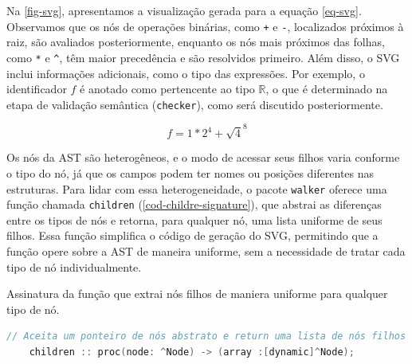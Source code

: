 Na \autoref{fig-svg}, apresentamos a visualização gerada para a equação \autoref{eq-svg}. Observamos que os nós de operações binárias, como \texttt{+} e \texttt{-}, localizados próximos à raiz, são avaliados posteriormente, enquanto os nós mais próximos das folhas, como \texttt{*} e \texttt{\^}, têm maior precedência e são resolvidos primeiro. Além disso, o SVG inclui informações adicionais, como o tipo das expressões. Por exemplo, o identificador \( f \) é anotado como pertencente ao tipo \( \mathbb{R} \), o que é determinado na etapa de validação semântica (\texttt{checker}), como será discutido posteriormente.

\begin{equation} \label{eq-svg}
   f =  1*2 ^ 4 +  \sqrt 4^8
\end{equation}

Os nós da AST são heterogêneos, e o modo de acessar seus filhos varia conforme o tipo do nó, já que os campos podem ter nomes ou posições diferentes nas estruturas. Para lidar com essa heterogeneidade, o pacote \texttt{walker} oferece uma função chamada \texttt{children} (\autoref{cod-childre-signature}), que abstrai as diferenças entre os tipos de nós e retorna, para qualquer nó, uma lista uniforme de seus filhos. 
Essa função simplifica o código de geração do SVG, permitindo que a função opere sobre a AST de maneira uniforme, sem a necessidade de tratar cada tipo de nó individualmente.


\begin{codigo}[h]
        \caption{\small Assinatura da função que extrai nós filhos de maniera uniforme para qualquer tipo de nó. }
        \label{cod-childre-signature}
  \begin{lstlisting}[language = C]
    // Aceita um ponteiro de nós abstrato e return uma lista de nós filhos
    children :: proc(node: ^Node) -> (array :[dynamic]^Node);
  \end{lstlisting}
\end{codigo}

